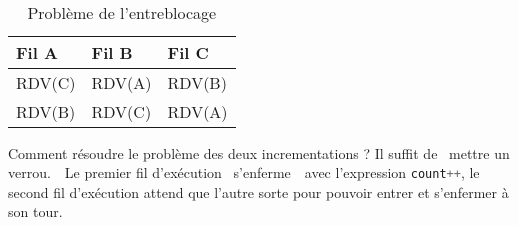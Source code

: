 \begin{exm}~

	\begin{table}[H]
		\centering
		\begin{tabular}{l|l|l}
			Fil A & Fil B & Fil C\\ \hline
			RDV(C) & RDV(A) & RDV(B)\\
			RDV(B) & RDV(C) & RDV(A)\\
		\end{tabular}
		\caption{Problème de l'entreblocage}
	\end{table}
\end{exm}

Comment résoudre le problème des deux incrementations ? Il suffit de \guillemotleft~mettre un verrou.~\guillemotright\ Le premier fil d'exécution \guillemotleft~s'enferme~\guillemotright\ avec l'expression \lstinline[language=c]!count++!, le second fil d'exécution attend que l'autre sorte pour pouvoir entrer et s'enfermer à son tour.

